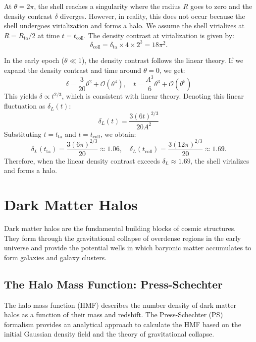 At $\theta = 2\pi$, the shell reaches a singularity where the radius $R$ goes to zero and the density contrast $\delta$ diverges. However, in reality, this does not occur because the shell undergoes virialization and forms a halo. We assume the shell virializes at $R = R_{\text{ta}}/2$ at time $t = t_{\text{coll}}$. The density contrast at virialization is given by:
\begin{equation}
    \delta_{\text{coll}} = \delta_{\text{ta}} \times 4 \times 2^3 = 18\pi^2.
\end{equation}

In the early epoch ($\theta \ll 1$), the density contrast follows the linear theory. If we expand the density contrast and time around $\theta = 0$, we get:
\begin{equation}
    \delta = \frac{3}{20} \theta^2 + \mathcal{O}(\theta^4), \quad t = \frac{A^3}{6} \theta^3 + \mathcal{O}(\theta^5)
\end{equation}
This yields $\delta \propto t^{2/3}$, which is consistent with linear theory. Denoting this linear fluctuation as $\delta_L(t)$:
\begin{equation}
    \delta_L(t) = \frac{3(6t)^{2/3}}{20A^2}
\end{equation}
Substituting $t = t_{\text{ta}}$ and $t = t_{\text{coll}}$, we obtain:
\begin{equation}
    \delta_L(t_{\text{ta}}) = \frac{3(6\pi)^{2/3}}{20} \approx 1.06, \quad \delta_L(t_{\text{coll}}) = \frac{3(12\pi)^{2/3}}{20} \approx 1.69.
\end{equation}
Therefore, when the linear density contrast exceeds $\delta_L \approx 1.69$, the shell virializes and forms a halo.

\section{Dark Matter Halos}
\label{sec:halo}
Dark matter halos are the fundamental building blocks of cosmic structures. They form through the gravitational collapse of overdense regions in the early universe and provide the potential wells in which baryonic matter accumulates to form galaxies and galaxy clusters. 

\subsection{The Halo Mass Function: Press-Schechter}
The halo mass function (HMF) describes the number density of dark matter halos as a function of their mass and redshift. The Press-Schechter (PS) formalism \citep{1974ApJ...187..425P} provides an analytical approach to calculate the HMF based on the initial Gaussian density field and the theory of gravitational collapse.


